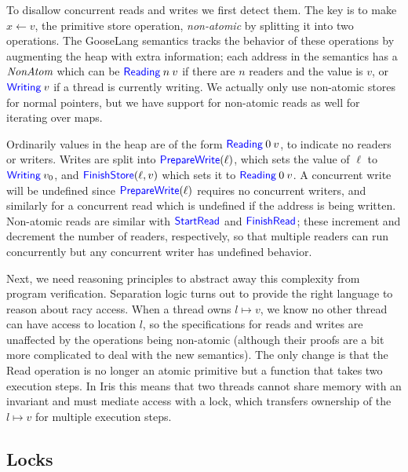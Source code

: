 To disallow concurrent reads and writes we first detect them. The key is to make
$x \gets v$, the primitive store operation, \emph{non-atomic} by splitting it
into two operations. The GooseLang semantics tracks the behavior of these
operations by augmenting the heap with extra information; each address in the
semantics has a $\textit{NonAtom}$ which can be
$\mathsf{\textcolor{blue}{Reading}} \: n \: v$ if there are $n$ readers and the value is $v$,
or $\mathsf{\textcolor{blue}{Writing}} \: v$ if a thread is currently writing. We actually only
use non-atomic stores for normal pointers, but we have support for non-atomic
reads as well for iterating over maps.

Ordinarily values in the heap are of the form $\mathsf{\textcolor{blue}{Reading}} \: 0 \: v$,
to indicate no readers or writers. Writes are split into
$\mathsf{\textcolor{blue}{PrepareWrite}}(\ell)$, which sets the value of $\ell$ to
$\mathsf{\textcolor{blue}{Writing}} \: v_{0}$, and $\mathsf{\textcolor{blue}{FinishStore}}(\ell, v)$ which sets
it to $\mathsf{\textcolor{blue}{Reading}} \: 0 \: v$. A concurrent write will be undefined
since $\mathsf{\textcolor{blue}{PrepareWrite}}(\ell)$ requires no concurrent writers, and
similarly for a concurrent read which is undefined if the address is being
written. Non-atomic reads are similar with $\mathsf{\textcolor{blue}{StartRead}}$ and
$\mathsf{\textcolor{blue}{FinishRead}}$; these increment and decrement the number of readers,
respectively, so that multiple readers can run concurrently but any concurrent
writer has undefined behavior.

Next, we need reasoning principles to abstract away this complexity from
program verification. Separation logic turns out to provide the right
language to reason about racy access. When a thread owns
$l \mapsto v$, we know no other thread can have access to location
$l$, so the specifications for reads and writes are unaffected by the
operations being non-atomic (although their proofs are a bit more
complicated to deal with the new semantics). The only change is that the
Read operation is no longer an atomic primitive but a function that
takes two execution steps. In Iris this means that two threads cannot
share memory with an invariant and must mediate access with a lock,
which transfers ownership of the $l \mapsto v$ for multiple execution
steps.

\subsection{Locks}

\newcommand{\Acquire}{\goosedef{Acquire}}
\newcommand{\CAS}{\goosedef{CAS}}

